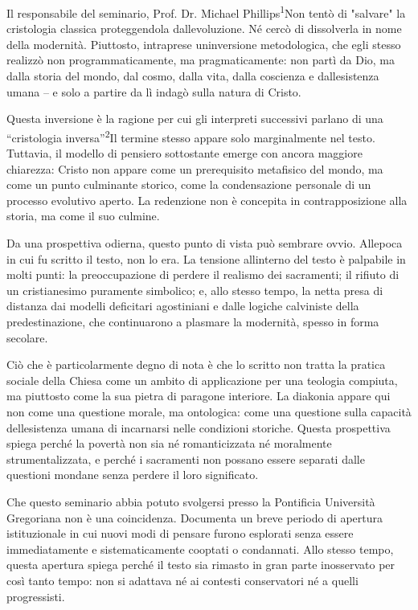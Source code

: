 \documentclass[
]{article}
\begin{document}
Il responsabile del seminario, Prof. Dr. Michael Phillips\textsuperscript{1}Non tentò di "salvare" la cristologia classica proteggendola dall\textquotesingle evoluzione. Né cercò di dissolverla in nome della modernità. Piuttosto, intraprese un\textquotesingle inversione metodologica, che egli stesso realizzò non programmaticamente, ma pragmaticamente: non partì da Dio, ma dalla storia del mondo, dal cosmo, dalla vita, dalla coscienza e dall\textquotesingle esistenza umana -- e solo a partire da lì indagò sulla natura di Cristo.

Questa inversione è la ragione per cui gli interpreti successivi parlano di una ``cristologia inversa''\textsuperscript{2}Il termine stesso appare solo marginalmente nel testo. Tuttavia, il modello di pensiero sottostante emerge con ancora maggiore chiarezza: Cristo non appare come un prerequisito metafisico del mondo, ma come un punto culminante storico, come la condensazione personale di un processo evolutivo aperto. La redenzione non è concepita in contrapposizione alla storia, ma come il suo culmine.

Da una prospettiva odierna, questo punto di vista può sembrare ovvio. All\textquotesingle epoca in cui fu scritto il testo, non lo era. La tensione all\textquotesingle interno del testo è palpabile in molti punti: la preoccupazione di perdere il realismo dei sacramenti; il rifiuto di un cristianesimo puramente simbolico; e, allo stesso tempo, la netta presa di distanza dai modelli deficitari agostiniani e dalle logiche calviniste della predestinazione, che continuarono a plasmare la modernità, spesso in forma secolare.

Ciò che è particolarmente degno di nota è che lo scritto non tratta la pratica sociale della Chiesa come un ambito di applicazione per una teologia compiuta, ma piuttosto come la sua pietra di paragone interiore. La diakonia appare qui non come una questione morale, ma ontologica: come una questione sulla capacità dell\textquotesingle esistenza umana di incarnarsi nelle condizioni storiche. Questa prospettiva spiega perché la povertà non sia né romanticizzata né moralmente strumentalizzata, e perché i sacramenti non possano essere separati dalle questioni mondane senza perdere il loro significato.

Che questo seminario abbia potuto svolgersi presso la Pontificia Università Gregoriana non è una coincidenza. Documenta un breve periodo di apertura istituzionale in cui nuovi modi di pensare furono esplorati senza essere immediatamente e sistematicamente cooptati o condannati. Allo stesso tempo, questa apertura spiega perché il testo sia rimasto in gran parte inosservato per così tanto tempo: non si adattava né ai contesti conservatori né a quelli progressisti.
\end{document}
